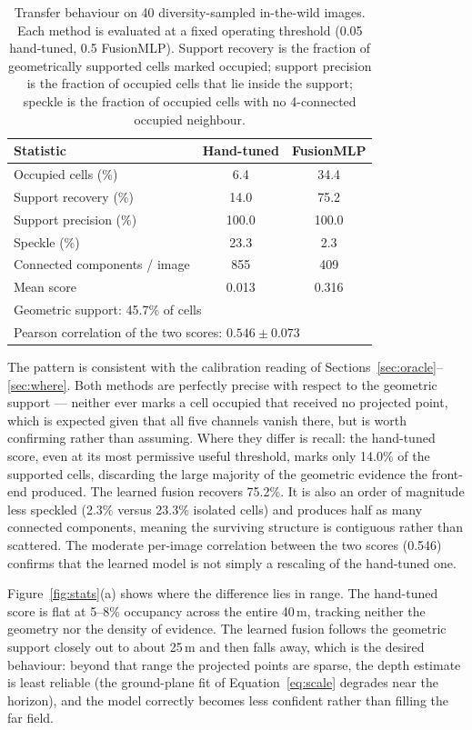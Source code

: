 \documentclass[sigconf]{acmart}
\newcommand{\rev}[1]{{\color{revcolor}#1}}
\begin{document}
\begin{table}[t]
\caption{Transfer behaviour on 40 diversity-sampled in-the-wild images. Each method is evaluated at \rev{a fixed operating threshold} (0.05 hand-tuned, 0.5 FusionMLP). Support recovery is the fraction of geometrically supported cells marked occupied; support precision is the fraction of occupied cells that lie inside the support; speckle is the fraction of occupied cells with no 4-connected occupied neighbour.}
\label{tab:transfer}
\begin{tabular}{lcc}
\toprule
Statistic & Hand-tuned & FusionMLP \\
\midrule
Occupied cells (\%) & 6.4 & 34.4 \\
Support recovery (\%) & 14.0 & 75.2 \\
Support precision (\%) & 100.0 & 100.0 \\
Speckle (\%) & 23.3 & 2.3 \\
Connected components / image & 855 & 409 \\
Mean score & 0.013 & 0.316 \\
\midrule
\multicolumn{3}{l}{Geometric support: 45.7\% of cells} \\
\multicolumn{3}{l}{Pearson correlation of the two scores: $0.546 \pm 0.073$} \\
\bottomrule
\end{tabular}
\end{table}

The pattern is consistent with the calibration reading of Section\rev{s~\ref{sec:oracle}--\ref{sec:where}}. Both methods are perfectly precise with respect to the geometric support --- neither ever marks a cell occupied that received no projected point, which is expected given that all five channels vanish there, but is worth confirming rather than assuming. Where they differ is recall: the hand-tuned score, even at its most permissive useful threshold, marks only 14.0\% of the supported cells, discarding the large majority of the geometric evidence the front-end produced. The learned fusion recovers 75.2\%. It is also an order of magnitude less speckled (2.3\% versus 23.3\% isolated cells) and produces half as many connected components, meaning the surviving structure is contiguous rather than scattered. The moderate per-image correlation between the two scores (0.546) confirms that the learned model is not simply a rescaling of the hand-tuned one.

Figure~\ref{fig:stats}(a) shows where the difference lies in range. The hand-tuned score is flat at 5--8\% occupancy across the entire 40\,m, tracking neither the geometry nor the density of evidence. The learned fusion follows the geometric support closely out to about 25\,m and then falls away, which is the desired behaviour: beyond that range the projected points are sparse, the depth estimate is least reliable (the ground-plane fit of Equation~\eqref{eq:scale} degrades near the horizon), and the model correctly becomes less confident rather than filling the far field.
\end{document}
